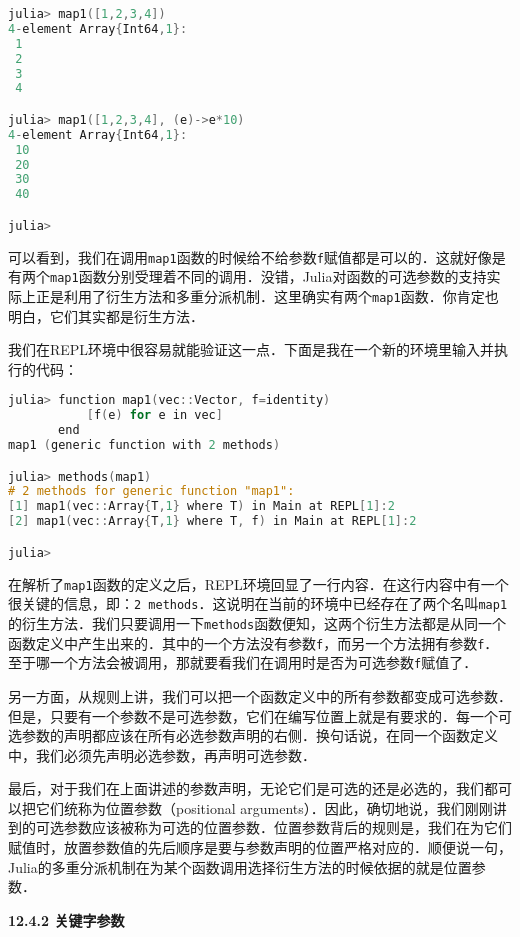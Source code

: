 \begin{lstlisting}[language=cpp]
julia> map1([1,2,3,4])
4-element Array{Int64,1}:
 1
 2
 3
 4

julia> map1([1,2,3,4], (e)->e*10)
4-element Array{Int64,1}:
 10
 20
 30
 40

julia> 
\end{lstlisting}

可以看到，我们在调用\verb|map1|函数的时候给不给参数\verb|f|赋值都是可以的．这就好像是有两个\verb|map1|函数分别受理着不同的调用．没错，Julia对函数的可选参数的支持实际上正是利用了衍生方法和多重分派机制．这里确实有两个\verb|map1|函数．你肯定也明白，它们其实都是衍生方法．

我们在REPL环境中很容易就能验证这一点．下面是我在一个新的环境里输入并执行的代码：

\begin{lstlisting}[language=cpp]
julia> function map1(vec::Vector, f=identity)
           [f(e) for e in vec]
       end
map1 (generic function with 2 methods)

julia> methods(map1)
# 2 methods for generic function "map1":
[1] map1(vec::Array{T,1} where T) in Main at REPL[1]:2
[2] map1(vec::Array{T,1} where T, f) in Main at REPL[1]:2

julia> 
\end{lstlisting}

在解析了\verb|map1|函数的定义之后，REPL环境回显了一行内容．在这行内容中有一个很关键的信息，即：\verb|2 methods|．这说明在当前的环境中已经存在了两个名叫\verb|map1|的衍生方法．我们只要调用一下\verb|methods|函数便知，这两个衍生方法都是从同一个函数定义中产生出来的．其中的一个方法没有参数\verb|f|，而另一个方法拥有参数\verb|f|．至于哪一个方法会被调用，那就要看我们在调用时是否为可选参数\verb|f|赋值了．

另一方面，从规则上讲，我们可以把一个函数定义中的所有参数都变成可选参数．但是，只要有一个参数不是可选参数，它们在编写位置上就是有要求的．每一个可选参数的声明都应该在所有必选参数声明的右侧．换句话说，在同一个函数定义中，我们必须先声明必选参数，再声明可选参数．

最后，对于我们在上面讲述的参数声明，无论它们是可选的还是必选的，我们都可以把它们统称为位置参数（positional arguments）．因此，确切地说，我们刚刚讲到的可选参数应该被称为可选的位置参数．位置参数背后的规则是，我们在为它们赋值时，放置参数值的先后顺序是要与参数声明的位置严格对应的．顺便说一句，Julia的多重分派机制在为某个函数调用选择衍生方法的时候依据的就是位置参数．

\textbf{12.4.2 关键字参数}


